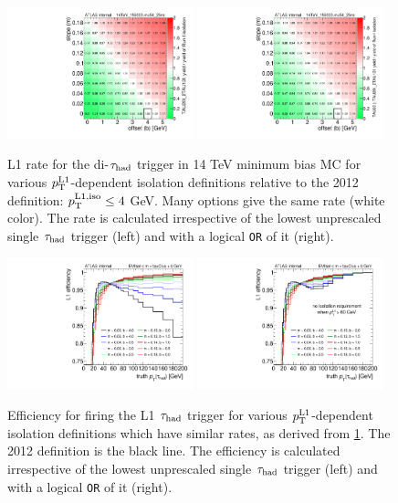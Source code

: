 \begin{figure}[!htpb]
  \centering
  \includegraphics[width=0.48\textwidth]{figures/trigger/iso_background_noTAU60}
  \includegraphics[width=0.48\textwidth]{figures/trigger/iso_background_yesTAU60}
  \caption{L1 rate for the di-$\tau_\text{had}$ trigger in 14 TeV minimum bias MC for various $p_{\mathrm{T}}^\text{L1}$-dependent isolation definitions relative to the 2012 definition: $p_{\mathrm{T}}^\text{L1,iso} \leq 4$ GeV. Many options give the same rate (white color). The rate is calculated irrespective of the lowest unprescaled single $\tau_\text{had}$ trigger (left) and with a logical \texttt{OR} of it (right).}
  \label{fig:prospects-trigger-isolation-rate}
\end{figure}

\begin{figure}[!htpb]
  \centering
  \includegraphics[width=0.48\textwidth]{figures/trigger/iso_turnonL1_noTAU60}
  \includegraphics[width=0.48\textwidth]{figures/trigger/iso_turnonL1_yesTAU60}
  \caption{Efficiency for firing the L1 $\tau_\text{had}$ trigger for various $p_{\mathrm{T}}^\text{L1}$-dependent isolation definitions which have similar rates, as derived from \cref{fig:prospects-trigger-isolation-rate}. The 2012 definition is the black line. The efficiency is calculated irrespective of the lowest unprescaled single $\tau_\text{had}$ trigger (left) and with a logical \texttt{OR} of it (right).}
  \label{fig:prospects-trigger-isolation-turnon}
\end{figure}


